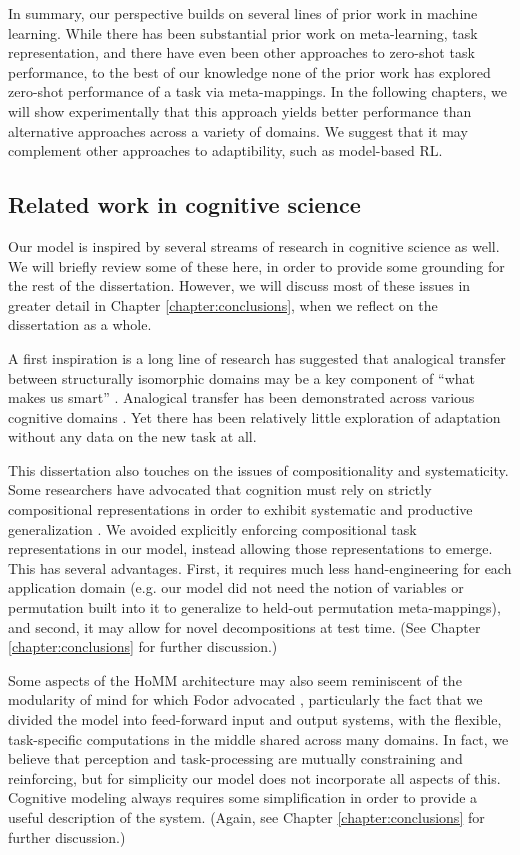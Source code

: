 In summary, our perspective builds on several lines of prior work in machine learning. While there has been substantial prior work on meta-learning, task representation, and there have even been other approaches to zero-shot task performance, to the best of our knowledge none of the prior work has explored zero-shot performance of a task via meta-mappings. In the following chapters, we will show experimentally that this approach yields better performance than alternative approaches across a variety of domains. We suggest that it may complement other approaches to adaptibility, such as model-based RL.

\subsection{Related work in cognitive science}
Our model is inspired by several streams of research in cognitive science as well. We will briefly review some of these here, in order to provide some grounding for the rest of the dissertation. However, we will discuss most of these issues in greater detail in Chapter \ref{chapter:conclusions}, when we reflect on the dissertation as a whole.   

A first inspiration is a long line of research has suggested that analogical transfer between structurally isomorphic domains may be a key component of ``what makes us smart'' \citep{Gentner2003}. Analogical transfer has been demonstrated across various cognitive domains \citep[e.g.][]{Bourne1970, Day2011}. Yet there has been relatively little exploration of adaptation without any data on the new task at all. 

This dissertation also touches on the issues of compositionality and systematicity. Some researchers have advocated that cognition must rely on strictly compositional representations in order to exhibit systematic and productive generalization \citep[e.g.][]{Fodor2001,Lake2017}.  We avoided explicitly enforcing compositional task representations in our model, instead allowing those representations to emerge. This has several advantages. First, it requires much less hand-engineering for each application domain (e.g. our model did not need the notion of variables or permutation built into it to generalize to held-out permutation meta-mappings), and second, it may allow for novel decompositions at test time. (See Chapter \ref{chapter:conclusions} for further discussion.) 

Some aspects of the HoMM architecture may also seem reminiscent of the modularity of mind for which Fodor advocated \citep{Fodor1983modularity}, particularly the fact that we divided the model into feed-forward input and output systems, with the flexible, task-specific computations in the middle shared across many domains. In fact, we believe that perception and task-processing are mutually constraining and reinforcing, but for simplicity our model does not incorporate all aspects of this. Cognitive modeling always requires some simplification in order to provide a useful description of the system. (Again, see Chapter \ref{chapter:conclusions} for further discussion.)   

